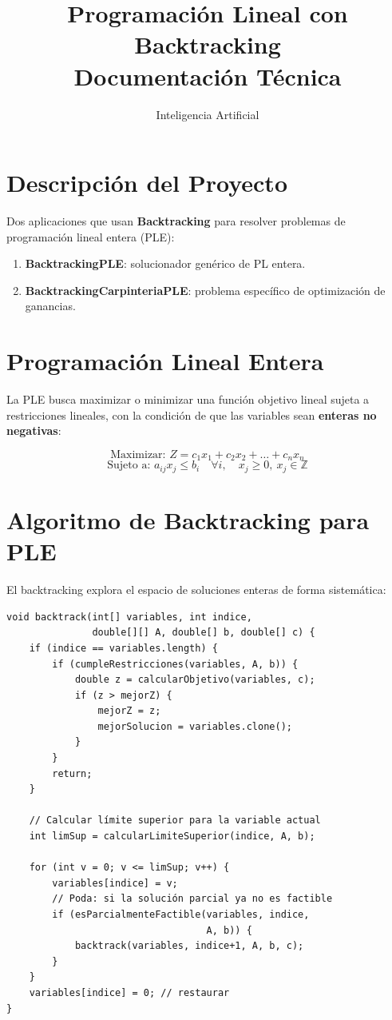 \documentclass[12pt,a4paper]{article}
\title{\textbf{Programación Lineal con Backtracking}\\
  \large Documentación Técnica}
\author{Inteligencia Artificial}
\date{}
\begin{document}
\maketitle
\tableofcontents
\newpage

\section{Descripción del Proyecto}
Dos aplicaciones que usan \textbf{Backtracking} para resolver problemas de programación lineal entera (PLE):
\begin{enumerate}
  \item \textbf{BacktrackingPLE}: solucionador genérico de PL entera.
  \item \textbf{BacktrackingCarpinteriaPLE}: problema específico de optimización de ganancias.
\end{enumerate}

\section{Programación Lineal Entera}

La PLE busca maximizar o minimizar una función objetivo lineal sujeta a restricciones lineales, con la condición de que las variables sean \textbf{enteras no negativas}:

\[
\text{Maximizar: } Z = c_1 x_1 + c_2 x_2 + \ldots + c_n x_n
\]
\[
\text{Sujeto a: } a_{ij} x_j \leq b_i \quad \forall i,\quad x_j \geq 0,\ x_j \in \mathbb{Z}
\]

\section{Algoritmo de Backtracking para PLE}

El backtracking explora el espacio de soluciones enteras de forma sistemática:

\begin{lstlisting}
void backtrack(int[] variables, int indice,
               double[][] A, double[] b, double[] c) {
    if (indice == variables.length) {
        if (cumpleRestricciones(variables, A, b)) {
            double z = calcularObjetivo(variables, c);
            if (z > mejorZ) {
                mejorZ = z;
                mejorSolucion = variables.clone();
            }
        }
        return;
    }

    // Calcular límite superior para la variable actual
    int limSup = calcularLimiteSuperior(indice, A, b);

    for (int v = 0; v <= limSup; v++) {
        variables[indice] = v;
        // Poda: si la solución parcial ya no es factible
        if (esParcialmenteFactible(variables, indice,
                                   A, b)) {
            backtrack(variables, indice+1, A, b, c);
        }
    }
    variables[indice] = 0; // restaurar
}
\end{lstlisting}
\end{document}
